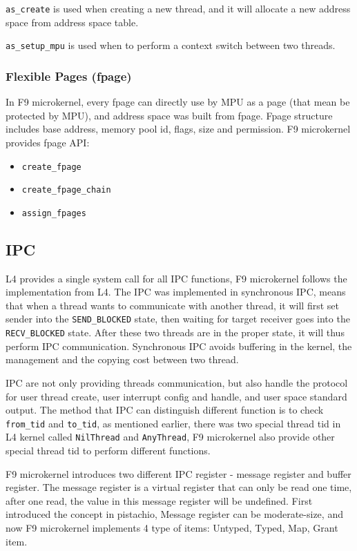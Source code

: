 \documentclass[10pt,preprint,nocopyrightspace]{sigplanconf}
\begin{document}
\verb|as_create| is used when creating a new thread, and it will allocate a new address space from address space table.

\verb|as_setup_mpu| is used when to perform a context switch between two threads.


\subsubsection{Flexible Pages (fpage)}
In F9 microkernel, every fpage can directly use by MPU as a page (that mean be protected by MPU), and address space was built from fpage. Fpage structure includes base address, memory pool id, flags, size and permission. F9 microkernel provides fpage API:
\begin{itemize}
	\item \verb|create_fpage|
	\item \verb|create_fpage_chain|
	\item \verb|assign_fpages|
\end{itemize}

\subsection{IPC}

L4 provides a single system call for all IPC functions, F9 microkernel follows the implementation from L4\cite{dannowski2011l4}. The IPC was implemented in synchronous IPC, means that when a thread wants to communicate with another thread, it will first set sender into the \verb|SEND_BLOCKED| state, then waiting for target receiver goes into the \verb|RECV_BLOCKED| state. After these two threads are in the proper state, it will thus perform IPC communication. Synchronous IPC avoids buffering in the kernel, the management and the copying cost between two thread.\cite{nourai2005aphysically}

IPC are not only providing threads communication, but also handle the protocol for user thread create, user interrupt config and handle, and user space standard output. The method that IPC can distinguish different function is to check \verb|from_tid| and \verb|to_tid|, as mentioned earlier, there was two special thread tid in L4 kernel  called \verb|NilThread| and \verb|AnyThread|, F9 microkernel also provide other special thread tid to perform different functions.

F9 microkernel introduces two different IPC register - message register and buffer register. The message register is a virtual register that can only be read one time, after one read, the value in this message register will be undefined. First introduced the concept in pistachio\cite{nourai2005aphysically}, Message register can be moderate-size, and now F9 microkernel implements 4 type of items: Untyped, Typed, Map, Grant item.
\end{document}
